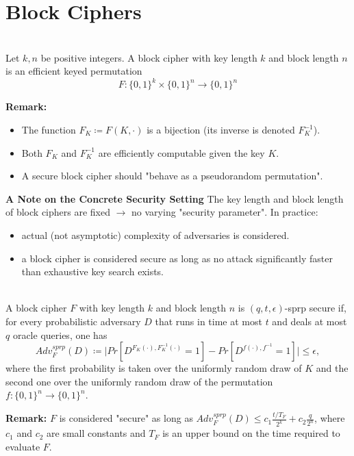 

\chapter{Block Ciphers}

\begin{definition}\ \\
    Let $k,n$ be positive integers. A block cipher with key length $k$ and block length $n$ is an efficient keyed permutation 
    $$F: \{0,1\}^k \times \{0,1\}^n \to \{0,1\}^n$$
    
    \textbf{Remark:}
    \begin{itemize}
        \item The function $F_K \coloneq F(K,\cdot)$ is a bijection (its inverse is denoted $F_K^{-1}$).
        \item Both $F_K$ and $F_K^{-1}$ are efficiently computable given the key $K$.
        \item A secure block cipher should "behave as a pseudorandom permutation".\newline
    \end{itemize}
\end{definition}


\textbf{A Note on the Concrete Security Setting}\newline
The key length and block length of block ciphers are fixed $\to$ no varying "security parameter". In practice:
\begin{itemize}
    \item actual (not asymptotic) complexity of adversaries is considered.
    \item a block cipher is considered secure as long as no attack significantly faster than exhaustive key search exists.\newline
\end{itemize}


\begin{definition}\ \\
    A block cipher $F$ with key length $k$ and block length $n$ is $(q,t,\epsilon)$-sprp secure if, for every probabilistic adversary $D$ that runs in time at most $t$ and deals at most $q$ oracle queries, one has
    $$Adv_F^{sprp}(D) \coloneq \vert Pr[D^{F_K(\cdot),F_K^{-1}(\cdot)}=1]-Pr[D^{f(\cdot),f^{-1}}=1] \vert \leq \epsilon,$$
    where the first probability is taken over the uniformly random draw of $K$ and the second one over the uniformly random draw of the permutation $f: \{0,1\}^n \to \{0,1\}^n$.\newline
    
    \textbf{Remark:}\newline
    $F$ is considered "secure" as long as $Adv_F^{sprp}(D) \leq c_1 \frac{t/T_F}{2^k} + c_2 \frac{q}{2^n}$, where $c_1$ and $c_2$ are small constants and $T_F$ is an upper bound on the time required to evaluate $F$.\newline
\end{definition}


